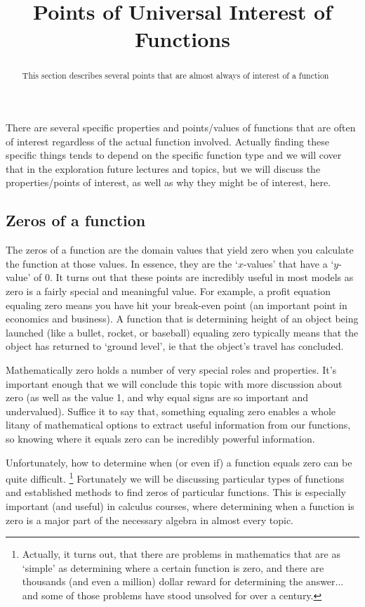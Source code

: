 \documentclass{ximeraXloud}
\title{Points of Universal Interest of Functions}
\begin{document}
\begin{abstract}
    This section describes several points that are almost always of interest of a function
\end{abstract}
\maketitle


    There are several specific properties and points/values of functions that are often of interest regardless of the actual function involved. Actually finding these specific things tends to depend on the specific function type and we will cover that in the exploration future lectures and topics, but we will discuss the properties/points of interest, as well as why they might be of interest, here.

\subsection*{Zeros of a function}
    The zeros of a function are the domain values that yield zero when you calculate the function at those values. In essence, they are the `$x$-values' that have a `$y$-value' of 0. It turns out that these points are incredibly useful in most models as zero is a fairly special and meaningful value. For example, a profit equation equaling zero means you have hit your break-even point (an important point in economics and business). A function that is determining height of an object being launched (like a bullet, rocket, or baseball) equaling zero typically means that the object has returned to `ground level', ie that the object's travel has concluded.
    
    Mathematically zero holds a number of very special roles and properties. It's important enough that we will conclude this topic with more discussion about zero (as well as the value 1, and why equal signs are so important and undervalued). Suffice it to say that, something equaling zero enables a whole litany of mathematical options to extract useful information from our functions, so knowing where it equals zero can be incredibly powerful information.
    
    Unfortunately, how to determine when (or even if) a function equals zero can be quite difficult.%
    \footnote{%
        Actually, it turns out, that there are problems in mathematics that are as `simple' as determining where a certain function is zero, and there are thousands (and even a million) dollar reward for determining the answer... and some of those problems have stood unsolved for over a century.%
        }
    Fortunately we will be discussing particular types of functions and established methods to find zeros of particular functions. This is especially important (and useful) in calculus courses, where determining when a function is zero is a major part of the necessary algebra in almost every topic.
    
\end{document}
